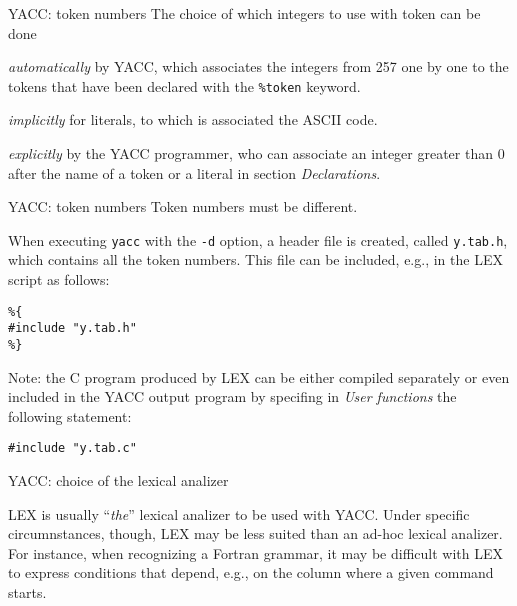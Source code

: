 \begin{frame}[fragile]{YACC: token numbers}
The choice of which integers to use with token can be done
\begin{description}
\item{\em automatically\/} by YACC, which associates the integers
from 257 one by one to the tokens that have been declared with
the \verb"%token" keyword.
\item{\em implicitly\/} for literals, to which is associated
the ASCII code.
\item{\em explicitly\/} by the YACC programmer, who can
associate an integer greater than 0 after the name of a token or a literal
in section \emph{Declarations}.
\end{description}

\end{frame}

\begin{frame}[fragile]{YACC: token numbers}
Token numbers must be different.


\vspace{20pt}

When executing {\tt yacc} with the {\tt -d} option, a header file
is created, called
{\tt y.tab.h}, which contains all the token numbers.
This file can be included, e.g., in the LEX script as follows:


\vspace{20pt}

\begin{verbatim}
%{
#include "y.tab.h"
%}
\end{verbatim}


\vspace{20pt}

Note: the C program produced by LEX can be either compiled separately
or even included in the YACC output program by specifing in
\emph{User functions\/} the following statement:
\begin{verbatim}
#include "y.tab.c"
\end{verbatim}
\end{frame}

\begin{frame}[fragile]{YACC: choice of the lexical analizer}

LEX is usually ``\emph{the\/}'' lexical analizer to be used with
YACC. Under specific circumnstances, though, LEX may be
less suited than an ad-hoc lexical analizer. For instance, when
recognizing a Fortran grammar, it may be difficult with LEX
to express conditions that depend, e.g., on the column
where a given command starts.
\end{frame}

